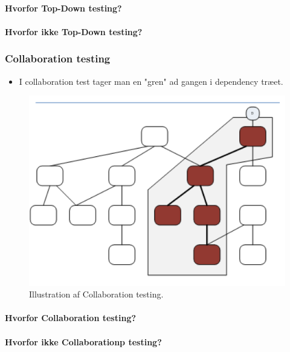 \paragraph{Hvorfor Top-Down testing?}

\paragraph{Hvorfor ikke Top-Down testing?}


\subsubsection{Collaboration testing}

\begin{itemize}
	\item I collaboration test tager man en "gren" ad gangen i dependency træet.
\end{itemize}

\begin{figure}
\centering
\includegraphics[width=0.7\linewidth]{figs/collaborationTesting.PNG}
\caption{Illustration af Collaboration testing.}
\label{fig:collaborationTesting}
\end{figure}

\paragraph{Hvorfor Collaboration testing?}

\paragraph{Hvorfor ikke Collaborationp testing?}

